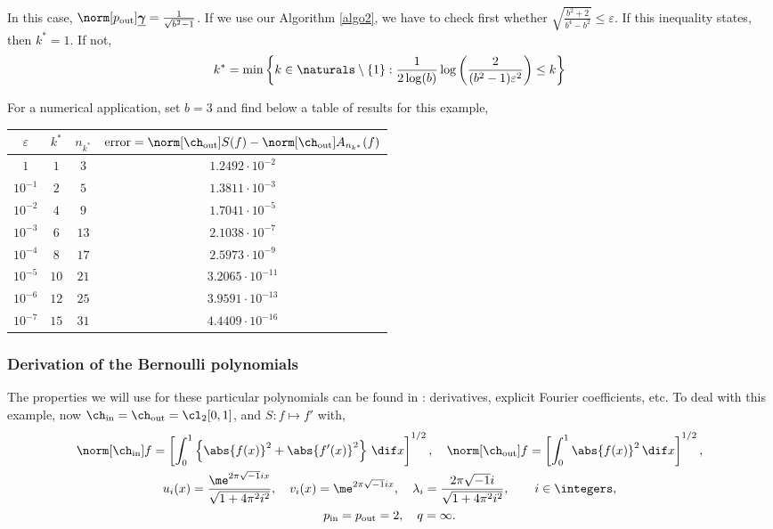 \documentclass[final]{elsarticle}
\newcommand{\chin}{\ch_{\text{\rm{in}}}}
\newcommand{\chout}{\ch_{\text{\rm{out}}}}
\newcommand{\pin}{p_{\text{\rm{in}}}}
\newcommand{\pout}{p_{\text{\rm{out}}}}
\newcommand{\bgamma}{\underline{\boldsymbol\gamma}}
\theoremstyle{definition}
\theoremstyle{remark}
\begin{document}
In this case, $\norm[\pout]{\bgamma}=\frac{1}{\sqrt{b^2-1}}$. If we use our Algorithm \ref{algo2}, we have to check first whether $\sqrt{\frac{b^2+2}{b^4-b^2}}\le\varepsilon$. If this inequality states, then $k^*=1$. If not,
\begin{equation*}
k^*=\min\left\{k\in\naturals\setminus\{1\}:\frac{1}{2\log(b)}\log\left(\frac{2}{(b^2-1)\varepsilon^2}\right) \le k \right\}
\end{equation*}

For a numerical application, set $b=3$ and find below a table of results for this example,

\begin{center}
\begin{tabular}{|c|c|c|c|}
  \hline
  $\varepsilon$ & $k^*$ & $n_{k^*}$ & $\operatorname{error}=\norm[\chout]{S(f)}-\norm[\chout]{A_{n_{k^*}}(f)}$ \\
  \hline
  $1$ & $1$ & $3$ & $1.2492\cdot10^{-2}$ \\
  $10^{-1}$ & $2$ & $5$ & $1.3811\cdot10^{-3}$ \\
  $10^{-2}$ & $4$ & $9$ & $1.7041\cdot10^{-5}$ \\
  $10^{-3}$ & $6$ & $13$ & $2.1038\cdot10^{-7}$ \\
  $10^{-4}$ & $8$ & $17$ & $2.5973\cdot10^{-9}$ \\
  $10^{-5}$ & $10$ & $21$ & $3.2065\cdot10^{-11}$ \\
  $10^{-6}$ & $12$ & $25$ & $3.9591\cdot10^{-13}$ \\
  $10^{-7}$ & $15$ & $31$ & $4.4409\cdot10^{-16}$ \\
  \hline
\end{tabular}
\end{center}

\subsubsection{Derivation of the Bernoulli polynomials}

The properties we will use for these particular polynomials can be found in \cite{AbrSte64}: derivatives, explicit Fourier coefficients, etc. To deal with this example, now $\chin=\chout=\cl_2[0,1]$, and $S: f \mapsto f'$ with,
\begin{gather*}
\norm[\chin]{f} = \left[\int_0^1 \left\{\abs{f(x)}^2 + \abs{f'(x)}^2\right\}\, \dif x\right]^{1/2}, \quad \norm[\chout]{f} = \left[\int_0^1 \abs{f(x)}^2 \, \dif x \right]^{1/2}, \\
u_{i}(x) = \frac{\me^{2 \pi \sqrt{-1} i x}}{\sqrt{1+4 \pi^2 i^2}}, \quad v_i(x) = \me^{2 \pi \sqrt{-1} i x}, \quad \lambda_i=\frac{2 \pi \sqrt{-1} i}{\sqrt{1+4 \pi^2 i^2}}, \qquad i \in \integers,\\
\pin=\pout=2,\quad q=\infty.
\end{gather*}
\end{document}
